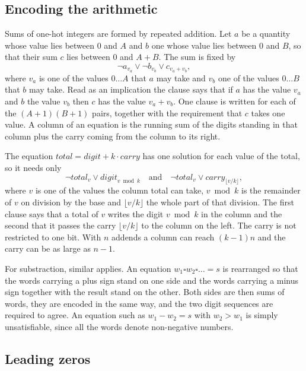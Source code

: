 \documentclass[11pt,a4paper]{article}
\begin{document}
\subsection*{Encoding the arithmetic}

Sums of one-hot integers are formed by repeated addition. Let $a$ be a quantity
whose value lies between $0$ and $A$ and $b$ one whose value lies between $0$
and $B$, so that their sum $c$ lies between $0$ and $A+B$. The sum is fixed by
\[
  \neg a_{v_a} \vee \neg b_{v_b} \vee c_{v_a + v_b},
\]
where $v_a$ is one of the values $0 \dots A$ that $a$ may take and $v_b$ one of
the values $0 \dots B$ that $b$ may take. Read as an implication the clause
says that if $a$ has the value $v_a$ and $b$ the value $v_b$ then $c$ has the
value $v_a + v_b$. One clause is written for each of the $(A+1)(B+1)$ pairs,
together with the requirement that $c$ takes one value. A column of an equation
is the running sum of the digits standing in that column plus the carry coming
from the column to its right.

The equation
$\mathit{total} = \mathit{digit} + k \cdot \mathit{carry}$ has one solution
for each value of the total, so it needs only
\[
  \neg \mathit{total}_v \vee \mathit{digit}_{v \bmod k}
  \quad\text{and}\quad
  \neg \mathit{total}_v \vee \mathit{carry}_{\lfloor v / k \rfloor},
\]
where $v$ is one of the values the column total can take, $v \bmod k$ is the
remainder of $v$ on division by the base and $\lfloor v / k \rfloor$ the whole
part of that division. The first clause says that a total of $v$ writes the
digit $v \bmod k$ in the column and the second that it passes the carry
$\lfloor v / k \rfloor$ to the column on the left. The carry is not
restricted to one bit. With $n$ addends a column can reach $(k-1)n$ and the
carry can be as large as $n-1$.

For substraction, similar applies. An equation
$w_1 \square w_2 \square \dots = s$ is rearranged so that the words carrying a
plus sign stand on one side and the words carrying a minus sign together with
the result stand on the other. Both sides are then sums of words, they are
encoded in the same way, and the two digit sequences are required to agree.
An equation such as $w_1 - w_2 = s$ with $w_2 > w_1$ is simply unsatisfiable,
since all the words denote non-negative numbers.

\subsection*{Leading zeros}
\end{document}
